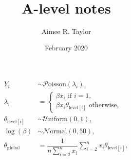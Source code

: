 \documentclass{article}
\title{A-level notes}
\author{Aimee R. Taylor}
\date{February 2020}
\begin{document}
\begin{align}
Y_i &\sim \mathcal{P}\text{oisson}(\lambda_i), \\
 \lambda_i &= 
\begin{cases}
\beta x_i \text{ if } i = 1, \\
\beta x_i \theta_{\text{level}[i]} \text{ otherwise}, 
\end{cases} \\
\theta_{\text{level}[i]} &\sim \mathcal{U}\text{niform}(0,1), \\
\log(\beta) &\sim \mathcal{N}\text{ormal}(0, 50), \\
\theta_{\text{global}} &= \dfrac{1}{n \sum_{i = 2}^n x_i} \sum_{i = 2}^n x_i \theta_{\text{level}[i]}, 
\end{align}
\end{document}
